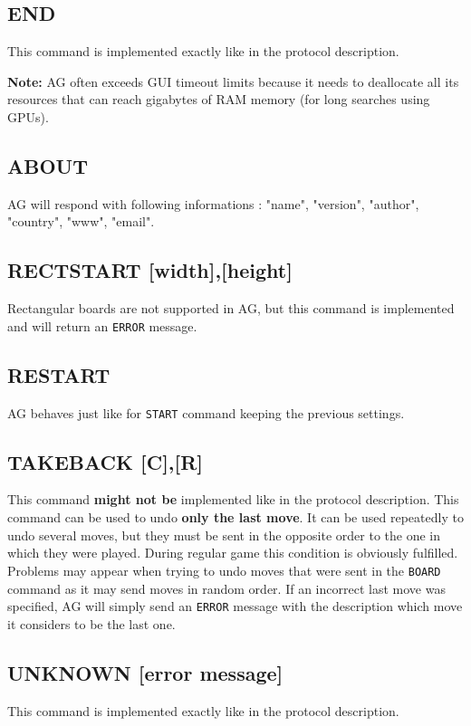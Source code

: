 \documentclass[12pt,a4paper]{article}
\begin{document}
\subsection{END}
\label{cmd_end}
This command is implemented exactly like in the protocol description.

\textbf{Note:} AG often exceeds GUI timeout limits because it needs to deallocate all its resources that can reach gigabytes of RAM memory (for long searches using GPUs).


\subsection{ABOUT}
\label{cmd_about}
AG will respond with following informations : "name", "version", "author", "country", "www", "email".


\subsection{RECTSTART [width],[height]}
\label{cmd_rectstart}
Rectangular boards are not supported in AG, but this command is implemented and will return an \texttt{ERROR} message.


\subsection{RESTART}
\label{cmd_restart}
AG behaves just like for \texttt{START} command keeping the previous settings.


\subsection{TAKEBACK [C],[R]}
\label{cmd_takeback}
This command \textbf{might not be} implemented like in the protocol description. This command can be used to undo \textbf{only the last move}. It can be used repeatedly to undo several moves, but they must be sent in the opposite order to the one in which they were played. During regular game this condition is obviously fulfilled. Problems may appear when trying to undo moves that were sent in the \texttt{BOARD} command as it may send moves in random order. If an incorrect last move was specified, AG will simply send an \texttt{ERROR} message with the description which move it considers to be the last one.


\subsection{UNKNOWN [error message]}
\label{cmd_unknown}
This command is implemented exactly like in the protocol description. 
\end{document}
